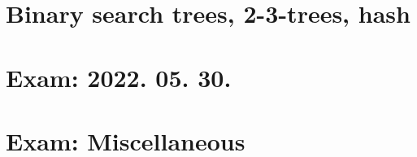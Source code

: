 \documentclass[a4paper]{article}
\begin{document}
\section{}
\section{}
\section{Binary search trees, 2-3-trees, hash}
\pagebreak

\section{Exam: 2022. 05. 30.}
\pagebreak
\pagebreak
\pagebreak
\pagebreak
\pagebreak
\pagebreak
\pagebreak

\section{Exam: Miscellaneous}
\pagebreak
\pagebreak
\end{document}
